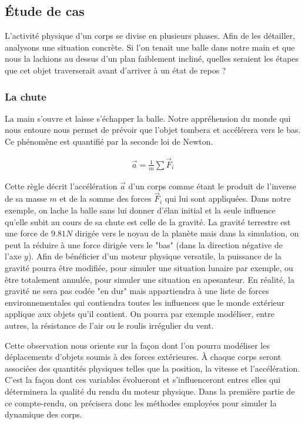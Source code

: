 \subsection{\'Etude de cas}

L'activité physique d'un corps se divise en plusieurs phases. Afin de
les détailler, analysons une situation concrète. Si l'on tenait une
balle dans notre main et que nous la lachions au dessus d'un plan
faiblement incliné, quelles seraient les étapes que cet objet
traverserait avant d'arriver à un état de repos ?

\subsubsection{La chute}

La main s'ouvre et laisse s'échapper la balle. Notre appréhension du
monde qui nous entoure nous permet de prévoir que l'objet tombera et
accélérera vers le bas. Ce phénomène est quantifié par la seconde loi
de Newton.

\begin{align*}
  \vec{a} = \frac{1}{m} \sum{\vec{F}_i}
\end{align*}

Cette règle décrit l'accélération $\vec{a}$ d'un corps comme étant le
produit de l'inverse de sa masse $m$ et de la somme des forces
$\vec{F}_i$ qui lui sont appliquées. Dans notre exemple, on lache la
balle sans lui donner d'élan initial et la seule influence qu'elle
subit au cours de sa chute est celle de la gravité. La gravité
terrestre est une force de $9.81 N$ dirigée vers le noyau de la
planète mais dans la simulation, on peut la réduire à une force
dirigée vers le "bas" (dans la direction négative de l'axe $y$). Afin
de bénéficier d'un moteur physique versatile, la puissance de la
gravité pourra être modifiée, pour simuler une situation lunaire par
exemple, ou être totalement annulée, pour simuler une situation en
apesanteur. En réalité, la gravité ne sera pas codée "en dur" mais
appartiendra à une liste de forces environnementales qui contiendra
toutes les influences que le monde extérieur applique aux objets qu'il
contient. On pourra par exemple modéliser, entre autres, la résistance
de l'air ou le roulis irrégulier du vent.

Cette observation nous oriente sur la façon dont l'on pourra modéliser
les déplacements d'objets soumis à des forces extérieures. \`A chaque
corps seront associées des quantités physiques telles que la position,
la vitesse et l'accélération. C'est la façon dont ces variables
évolueront et s'influenceront entres elles qui déterminera la qualité
du rendu du moteur physique. Dans la première partie de ce
compte-rendu, on précisera donc les méthodes employées pour simuler la
dynamique des corps.

